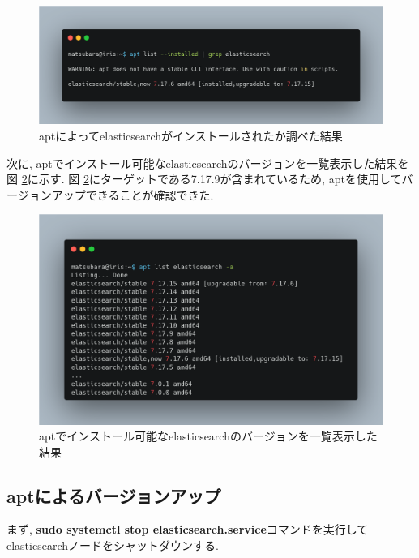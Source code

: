 \begin{figure}[h]
  \begin{center}
    \includegraphics[width=160mm]{sotu/figure/apt-grep.png}
    \caption{aptによってelasticsearchがインストールされたか調べた結果}
    \label{4-p1}
  \end{center}
\end{figure}

次に, aptでインストール可能なelasticsearchのバージョンを一覧表示した結果を図 \ref{4-p2}に示す. 図 \ref{4-p2}にターゲットである7.17.9が含まれているため, aptを使用してバージョンアップできることが確認できた.

\begin{figure}[h]
  \begin{center}
    \includegraphics[width=160mm]{sotu/figure/apt-list.png}
    \caption{aptでインストール可能なelasticsearchのバージョンを一覧表示した結果}
    \label{4-p2}
  \end{center}
\end{figure}

\subsection{aptによるバージョンアップ}

まず, \textbf{sudo systemctl stop elasticsearch.service}コマンドを実行してelasticsearchノードをシャットダウンする.

